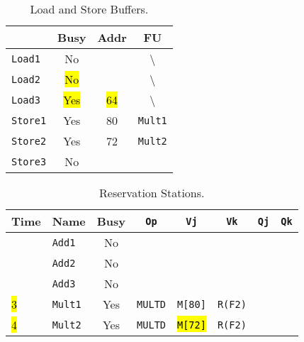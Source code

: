 \begin{enumerate}
    \begin{table}[!htp]
        \centering
        \begin{tabular}{@{} l | c c c @{}}
            \toprule
                                & Busy      & Addr      & FU   \\
            \midrule
            \texttt{Load1}      & No        &           & \textbackslash        \\ [.3em]
            \texttt{Load2}      & \hl{No}   &           & \textbackslash        \\ [.3em]
            \texttt{Load3}      & \hl{Yes}  & \hl{64}   & \textbackslash        \\
            \cmidrule{1-4}
            \texttt{Store1}     & Yes       & 80        & \texttt{Mult1}        \\ [.3em]
            \texttt{Store2}     & Yes       & 72        & \texttt{Mult2}        \\ [.3em]
            \texttt{Store3}     & No        &           &                       \\
            \bottomrule
        \end{tabular}
        \caption*{Load and Store Buffers.}
    \end{table}

    \newpage

    \begin{table}[!htp]
        \centering
        \begin{tabular}{@{} l l | c c c c c c @{}}
            \toprule
            Time        & Name              & Busy      & \texttt{Op}           & \texttt{Vj}           & \texttt{Vk}           & \texttt{Qj}           & \texttt{Qk}       \\
            \midrule
                        & \texttt{Add1}     & No        &                       &                       &                       &                       &                   \\ [.3em]
                        & \texttt{Add2}     & No        &                       &                       &                       &                       &                   \\ [.3em]
                        & \texttt{Add3}     & No        &                       &                       &                       &                       &                   \\ [.3em]
            \hl{3}      & \texttt{Mult1}    & Yes       & \texttt{MULTD}        & \texttt{M[80]}        & \texttt{R(F2)}        &                       &                   \\ [.3em]
            \hl{4}      & \texttt{Mult2}    & Yes       & \texttt{MULTD}        & \hl{\texttt{M[72]}}   & \texttt{R(F2)}        &                       &                   \\
            \bottomrule
        \end{tabular}
        \caption*{Reservation Stations.}
    \end{table}


\end{enumerate}
